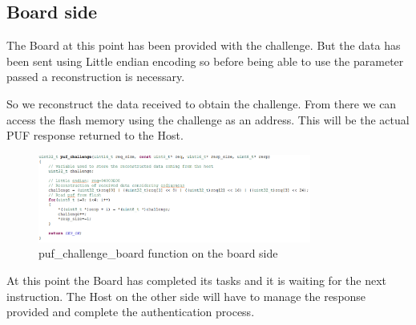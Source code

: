 \subsection{Board side}

The Board at this point has been provided with the challenge. But the data has been sent using Little endian encoding so before being able to use the parameter passed a reconstruction is necessary.

So we reconstruct the data received to obtain the challenge. From there we can access the flash memory using the challenge as an address. This will be the actual PUF response returned to the Host.

\begin{figure}[h!]
	\vspace{0.5cm}
	\includegraphics[width = 0.8\textwidth]{images/puf_challenge_board.png}
	\caption{puf\_challenge\_board function on the board side}
	\label{fig:puf_challenge_board}
\end{figure}

At this point the Board has completed its tasks and it is waiting for the next instruction. The Host on the other side will have to manage the response provided and complete the authentication process.